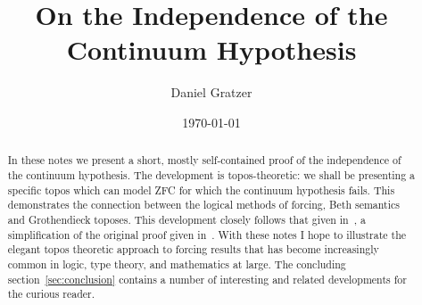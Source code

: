 \documentclass[12pt]{amsart}
\title{On the Independence of the Continuum Hypothesis}
\author{Daniel Gratzer}
\date{\today}
\begin{document}
\begin{abstract}
  In these notes we present a short, mostly self-contained proof of
  the independence of the continuum hypothesis. The development is
  topos-theoretic: we shall be presenting a specific topos which can
  model ZFC for which the continuum hypothesis fails. This
  demonstrates the connection between the logical methods of forcing,
  Beth semantics and Grothendieck toposes. This development closely
  follows that given in~\citet{MacLane:92}, a simplification of the
  original proof given in~\citet{Cohen:63}. With these notes I hope to
  illustrate the elegant topos theoretic approach to forcing results
  that has become increasingly common in logic, type theory, and
  mathematics at large. The concluding section~\ref{sec:conclusion}
  contains a number of interesting and related developments for the
  curious reader.
\end{abstract}
\maketitle








{}
\end{document}
